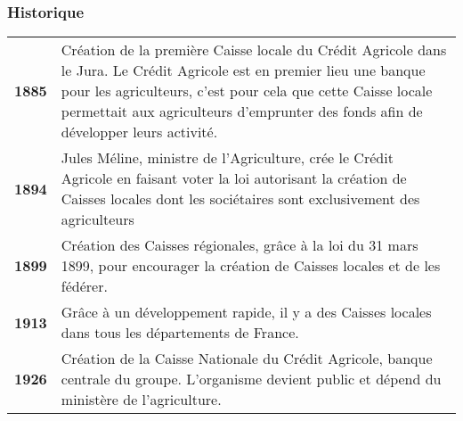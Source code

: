 \documentclass[12pt,a4paper]{article}
\begin{document}
\subsubsection{Historique}
\begin{tabular}{lp{15.5cm}}
\textbf{1885} & Création de la première Caisse locale du Crédit Agricole dans le Jura. Le Crédit Agricole est en premier lieu une banque pour les agriculteurs, c'est pour cela que cette Caisse locale permettait aux agriculteurs d'emprunter des fonds afin de développer leurs activité.\medskip \\
\textbf{1894} & Jules Méline, ministre de l'Agriculture, crée le Crédit Agricole en faisant voter la loi autorisant la création de Caisses locales dont les sociétaires sont exclusivement des agriculteurs\medskip \\
\textbf{1899} & Création des Caisses régionales, grâce à la loi du 31 mars 1899, pour encourager la création de Caisses locales et de les fédérer.\medskip \\
\textbf{1913} & Grâce à un développement rapide, il y a des Caisses locales dans tous les départements de France.\medskip \\
\textbf{1926} & Création de la Caisse Nationale du Crédit Agricole, banque centrale du groupe. L'organisme devient public et dépend du ministère de l'agriculture.\medskip \\
\end{tabular}
\end{document}
